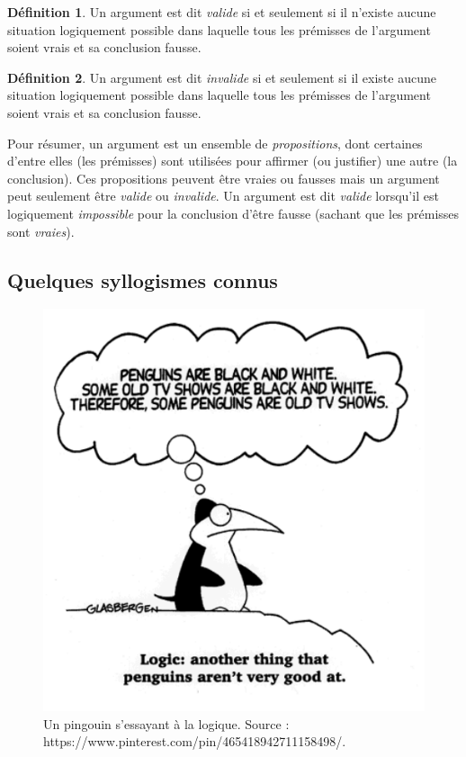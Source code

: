 \documentclass[
  a4paper,11pt,twoside,onecolumn,openright,final,oldfontcommands]{memoir}
\theoremstyle{definition}
\newtheorem{definition}{Définition}[chapter]
\theoremstyle{definition}
\theoremstyle{definition}
\theoremstyle{definition}
\theoremstyle{remark}
\begin{document}
\begin{definition}
\protect\hypertarget{def:valide}{}\label{def:valide}Un argument est dit \emph{valide} si et seulement si il n'existe aucune situation logiquement possible dans laquelle tous les prémisses de l'argument soient vrais et sa conclusion fausse.
\end{definition}

\begin{definition}
\protect\hypertarget{def:invalide}{}\label{def:invalide}Un argument est dit \emph{invalide} si et seulement si il existe aucune situation logiquement possible dans laquelle tous les prémisses de l'argument soient vrais et sa conclusion fausse.
\end{definition}

Pour résumer, un argument est un ensemble de \emph{propositions}, dont certaines d'entre elles (les prémisses) sont utilisées pour affirmer (ou justifier) une autre (la conclusion). Ces propositions peuvent être vraies ou fausses mais un argument peut seulement être \emph{valide} ou \emph{invalide}. Un argument est dit \emph{valide} lorsqu'il est logiquement \emph{impossible} pour la conclusion d'être fausse (sachant que les prémisses sont \emph{vraies}).

\hypertarget{quelques-syllogismes-connus}{%
\subsection{Quelques syllogismes connus}\label{quelques-syllogismes-connus}}

\begin{figure}[!htb]

{\centering \includegraphics[width=0.5\linewidth]{figures/penguin} 

}

\caption{Un pingouin s'essayant à la logique. Source : https://www.pinterest.com/pin/465418942711158498/.}\label{fig:penguin}
\end{figure}
\end{document}
